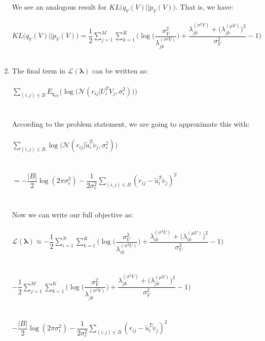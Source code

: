 \documentclass[submit]{harvardml}
\newcommand{\N}{\mathcal{N}}
\theoremstyle{plain}
\begin{document}
\begin{enumerate}[label=2.\arabic*.]
We see an analogous result for $KL\big(q_{V}(V)||p_{V}(V)\big)$. That is, we have:\\\\
$KL\big(q_{V}(V)||p_{V}(V)\big)=\dfrac{1}{2}\displaystyle\sum_{j=1}^M\displaystyle\sum_{k=1}^K\Bigg(\log\Bigg(\dfrac{\sigma_V^2}{\lambda_{jk}^{(\sigma^2V)}}\Bigg)+\dfrac{\lambda_{jk}^{(\sigma^2V)}+\Big(\lambda_{jk}^{(\mu V)}\Big)^2}{\sigma_V^2}-1\Bigg)$\\\\
\item The final term in $\mathcal{L}(\bm{\lambda})$ can be written as:\\\\
$\displaystyle\sum_{(i,j)\in B}E_{q_{UV}}\Big(\log\big(\N(r_{ij}|U_i^TV_j,\sigma_{\epsilon}^2)\big)\Big)$\\\\\\
According to the problem statement, we are going to approximate this with:\\\\
$\displaystyle\sum_{(i,j)\in B}\log\big(\N(r_{ij}|\tilde{u}_i^T\tilde{v}_j,\sigma_{\epsilon}^2)\big)$\\\\\\
$=-\dfrac{|B|}{2}\log(2\pi\sigma_{\epsilon}^2)-\dfrac{1}{2\sigma_{\epsilon}^2}\displaystyle\sum_{(i,j)\in B}(r_{ij}-\tilde{u}_i^T\tilde{v}_j)^2$\\\\\\
Now we can write our full objective as:\\\\
$\mathcal{L}(\bm{\lambda})\approx-\dfrac{1}{2}\displaystyle\sum_{i=1}^N\displaystyle\sum_{k=1}^K\Bigg(\log\Bigg(\dfrac{\sigma_U^2}{\lambda_{ik}^{(\sigma^2U)}}\Bigg)+\dfrac{\lambda_{ik}^{(\sigma^2U)}+\Big(\lambda_{ik}^{(\mu U)}\Big)^2}{\sigma_U^2}-1\Bigg)$\\\\\\
$-\dfrac{1}{2}\displaystyle\sum_{j=1}^M\displaystyle\sum_{k=1}^K\Bigg(\log\Bigg(\dfrac{\sigma_V^2}{\lambda_{jk}^{(\sigma^2V)}}\Bigg)+\dfrac{\lambda_{jk}^{(\sigma^2V)}+\Big(\lambda_{jk}^{(\mu V)}\Big)^2}{\sigma_V^2}-1\Bigg)$\\\\\\
$-\dfrac{|B|}{2}\log(2\pi\sigma_{\epsilon}^2)-\dfrac{1}{2\sigma_{\epsilon}^2}\displaystyle\sum_{(i,j)\in B}(r_{ij}-\tilde{u}_i^T\tilde{v}_j)^2$\\\\

\end{enumerate}
\end{document}
